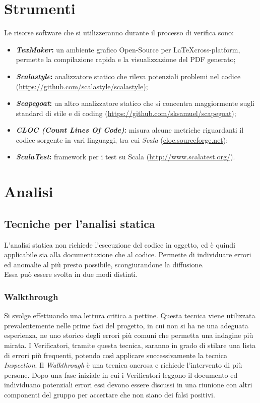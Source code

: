 \documentclass[a4paper]{report}
\begin{document}
		\section{Strumenti}
			Le risorse software che si utilizzeranno durante il processo di verifica sono:
			\begin{itemize}
				\item \textbf{\emph{TexMaker}:} un ambiente grafico Open-Source per \LaTeX cross-platform, permette 
				la compilazione rapida e la visualizzazione del PDF generato;
				\item \textbf{\emph{Scalastyle}:} analizzatore statico che rileva potenziali problemi nel codice
				 (\url{https://github.com/scalastyle/scalastyle});
				\item \textbf{\emph{Scapegoat}:} un altro analizzatore statico che si concentra maggiormente sugli 
				standard di stile e di coding (\url{https://github.com/sksamuel/scapegoat});
				\item \textbf{\emph{CLOC (Count Lines Of Code)}:} misura alcune metriche riguardanti il codice 
				sorgente in vari linguaggi, tra cui \emph{Scala} (\url{cloc.sourceforge.net});
				\item \textbf{\emph{ScalaTest}:} framework per i test su Scala (\url{http://www.scalatest.org/}).
			\end{itemize}
		\section{Analisi}
			\subsection{Tecniche per l'analisi statica}
				L'analisi statica non richiede l'esecuzione del codice in oggetto, ed è quindi applicabile sia 
				alla documentazione che al codice. Permette di individuare errori ed anomalie al più presto possibile, 
				scongiurandone la diffusione. \\ Essa può essere svolta in due modi distinti.
				\subsubsection{Walkthrough}
					Si svolge effettuando una lettura critica a pettine. Questa tecnica viene utilizzata prevalentemente 
					nelle prime fasi del progetto, in cui non si ha ne una adeguata esperienza, ne uno storico degli errori 
					più comuni che permetta una indagine più mirata. I Verificatori, tramite questa tecnica, saranno in 
					grado di stilare una lista di errori più frequenti, potendo così applicare successivamente la tecnica 
					\emph{Inspection}. Il \emph{Walkthrough} è una tecnica onerosa e richiede l'intervento di più persone. 
					Dopo una fase iniziale in cui i Verificatori leggono il documento ed individuano potenziali errori essi 
					devono essere discussi in una riunione con altri componenti del gruppo per accertare che non siano dei 
					falsi positivi.
\end{document}
